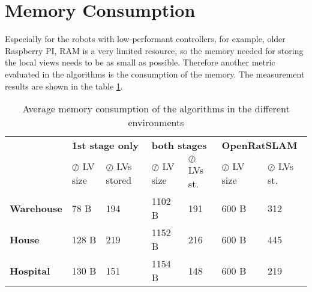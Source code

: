 \section{Memory Consumption}\label{section:memoryConsumption}

Especially for the robots with low-performant controllers, for example, older Raspberry PI, RAM is a very limited resource, so the memory needed for storing the local views needs to be as small as possible. Therefore another metric evaluated in the algorithms is the consumption of the memory. The measurement results are shown in the table \ref{tab:memory}.\par

\begin{table}[htpb]
    \caption{Average memory consumption of the algorithms in the different environments}\label{tab:memory}
    \centering
    \begin{tabular}{l | l  l| l l| l l}
        \toprule
        \textbf{}          & \multicolumn{2}{l|}{\textbf{1st stage only}} & \multicolumn{2}{l|}{\textbf{both stages}} & \multicolumn{2}{l}{\textbf{OpenRatSLAM}}                                                             \\
        {}                 & $\oslash$ LV size                            & $\oslash$ LVs stored                      & $\oslash$ LV size                        & $\oslash$ LVs st. & $\oslash$ LV size & $\oslash$ LVs st. \\
        \hline
        \textbf{Warehouse} & 78 B                                         & 194                                       & 1102 B                                   & 191               & 600 B             & 312               \\
        \textbf{House}     & 128 B                                        & 219                                       & 1152 B                                   & 216               & 600 B             & 445               \\
        \textbf{Hospital}  & 130 B                                        & 151                                       & 1154 B                                   & 148               & 600 B             & 219               \\
        \bottomrule
    \end{tabular}
\end{table}

